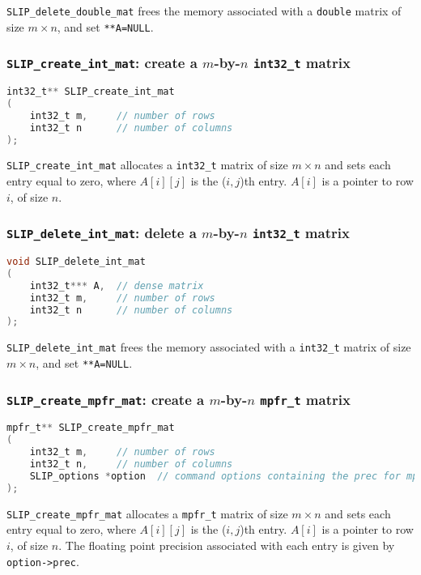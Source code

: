 \documentclass[11pt]{article}
\theoremstyle{definition}
\begin{document}
\verb|SLIP_delete_double_mat| frees the memory associated with a \verb|double| matrix of size $m \times n$, and set \verb|**A=NULL|.


\cprotect\subsubsection{\verb|SLIP_create_int_mat|: create a $m$-by-$n$ \verb|int32_t| matrix}


\begin{lstlisting}[language=C,frame=single]
int32_t** SLIP_create_int_mat
(
    int32_t m,     // number of rows
    int32_t n      // number of columns
);
\end{lstlisting}

\verb|SLIP_create_int_mat| allocates a \verb|int32_t| matrix of size $m \times n$ and sets each entry equal to zero, where $A[i][j]$ is the ($i,j$)th entry. $A[i]$ is a pointer to row $i$, of size $n$.

\cprotect\subsubsection{\verb|SLIP_delete_int_mat|: delete a $m$-by-$n$ \verb|int32_t| matrix}


\begin{lstlisting}[language=C,frame=single]
void SLIP_delete_int_mat
(
    int32_t*** A,  // dense matrix
    int32_t m,     // number of rows
    int32_t n      // number of columns
);
\end{lstlisting}

\verb|SLIP_delete_int_mat| frees the memory associated with a \verb|int32_t| matrix of size $m \times n$, and set \verb|**A=NULL|.

\cprotect\subsubsection{\verb|SLIP_create_mpfr_mat|: create a $m$-by-$n$ \verb|mpfr_t| matrix}
\label{ss:create_mpfr_mat}


\begin{lstlisting}[language=C,frame=single]
mpfr_t** SLIP_create_mpfr_mat
(
    int32_t m,     // number of rows
    int32_t n,     // number of columns
    SLIP_options *option  // command options containing the prec for mpfr
);
\end{lstlisting}

\verb|SLIP_create_mpfr_mat| allocates a \verb|mpfr_t| matrix of size $m \times n$ and sets each entry equal to zero, where $A[i][j]$ is the ($i,j$)th entry. $A[i]$ is a pointer to row $i$, of size $n$. The floating point precision associated with each entry is given by \verb|option->prec|.
\end{document}
